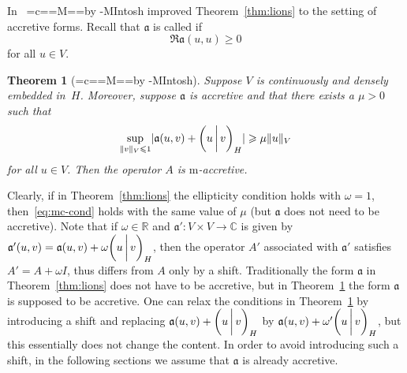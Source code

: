 \documentclass[a4paper,oneside,12pt]{amsart}
\theoremstyle{plain}
\newtheorem{theorem}{Theorem}[section]
\theoremstyle{definition}
\let\le=\leqslant
\let\ge=\geqslant
\DeclarePairedDelimiter\norm{\lVert}{\rVert}
\DeclarePairedDelimiter\abs{\lvert}{\rvert}
\DeclareRobustCommand{\Mc}{\setbox0=\hbox{c}\mycheight=\ht0\setbox0=\hbox{M}\myMheight=\ht0\mycshift=\myMheight\advance\mycshift by -\mycheight\mbox{M\raisebox{\mycshift}{c}I}}
\DeclareRobustCommand{\McIntosh}{{\Mc}ntosh\xspace}
\begin{document}
In~\cite{McIntosh1968:repres} \McIntosh improved Theorem~\ref{thm:lions} to the setting of accretive forms. Recall that ${{\mathfrak{{a}}}}$ is called {\textbf{\unboldmath}} if 
\[
    \Re {{\mathfrak{{a}}}}(u,u)\ge 0
\]
for all $u\in V$.
\begin{theorem}[\McIntosh]\label{thm:mcintosh}
Suppose $V$ is continuously and densely embedded in~$H$. Moreover, suppose ${{\mathfrak{{a}}}}$ is accretive and that there exists a $\mu >0$ such that
\begin{equation}\label{eq:mc-cond}
    \sup_{\norm{v}_V\le 1}\abs{{{\mathfrak{{a}}}}(u,v) + {{\ifthenelse{\equal{auto}{auto}}{\left({u}\mkern3mu{\biggm|}\mkern3mu {v}\right)}{}
\ifthenelse{\equal{auto}{b}}{\bigl({u}\mkern3mu{\biggm|}\mkern3mu {v}\bigr)}{}
\ifthenelse{\equal{auto}{B}}{\Bigl({u}\mkern3mu{\bigm|}\mkern3mu {v}\Bigr)}{}
}}_H}\ge \mu\norm{u}_V 
\end{equation}
for all $u\in V$. Then the operator $A$ is {\ensuremath{\text{m}}}-accretive.
\end{theorem}
Clearly, if in Theorem~\ref{thm:lions} the ellipticity condition holds with $\omega=1$, 
then~\eqref{eq:mc-cond} holds with the same value of $\mu$ (but ${{\mathfrak{{a}}}}$ does not need to be accretive).
Note that if $\omega\in{\mathbb{R}}$ and ${{\mathfrak{{a}}}}'\colon V\times V\to{\mathbb{C}}$ is given by ${{\mathfrak{{a}}}}'(u,v)={{\mathfrak{{a}}}}(u,v)+\omega{{\ifthenelse{\equal{auto}{auto}}{\left({u}\mkern3mu{\biggm|}\mkern3mu {v}\right)}{}
\ifthenelse{\equal{auto}{b}}{\bigl({u}\mkern3mu{\biggm|}\mkern3mu {v}\bigr)}{}
\ifthenelse{\equal{auto}{B}}{\Bigl({u}\mkern3mu{\bigm|}\mkern3mu {v}\Bigr)}{}
}}_H$,
then the operator $A'$ associated with ${{\mathfrak{{a}}}}'$ satisfies $A'=A+\omega I$, thus differs from $A$ only by a shift.
Traditionally the form ${{\mathfrak{{a}}}}$ in Theorem~\ref{thm:lions} does not have to be accretive, but in Theorem~\ref{thm:mcintosh} 
the form ${{\mathfrak{{a}}}}$ is supposed to be accretive.
One can relax the conditions in Theorem~\ref{thm:mcintosh} by introducing a shift and replacing ${{\mathfrak{{a}}}}(u,v)+{{\ifthenelse{\equal{auto}{auto}}{\left({u}\mkern3mu{\biggm|}\mkern3mu {v}\right)}{}
\ifthenelse{\equal{auto}{b}}{\bigl({u}\mkern3mu{\biggm|}\mkern3mu {v}\bigr)}{}
\ifthenelse{\equal{auto}{B}}{\Bigl({u}\mkern3mu{\bigm|}\mkern3mu {v}\Bigr)}{}
}}_H$ by ${{\mathfrak{{a}}}}(u,v)+\omega'{{\ifthenelse{\equal{auto}{auto}}{\left({u}\mkern3mu{\biggm|}\mkern3mu {v}\right)}{}
\ifthenelse{\equal{auto}{b}}{\bigl({u}\mkern3mu{\biggm|}\mkern3mu {v}\bigr)}{}
\ifthenelse{\equal{auto}{B}}{\Bigl({u}\mkern3mu{\bigm|}\mkern3mu {v}\Bigr)}{}
}}_H$,
but this essentially does not change the content.
In order to avoid introducing such a shift, in the following sections we assume that ${{\mathfrak{{a}}}}$ is already accretive.
\end{document}
